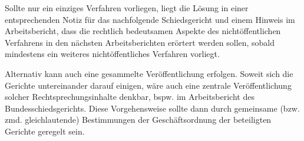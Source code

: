 Sollte nur ein einziges Verfahren vorliegen, liegt die Lösung in einer entsprechenden Notiz für das nachfolgende Schiedsgericht und einem Hinweis im Arbeitsbericht, dass die rechtlich bedeutsamen Aspekte des nichtöffentlichen Verfahrens in den nächsten Arbeitsberichten erörtert werden sollen, sobald mindestens ein weiteres nichtöffentliches Verfahren vorliegt.

Alternativ kann auch eine gesammelte Veröffentlichung erfolgen.
Soweit sich die Gerichte untereinander darauf einigen, wäre auch eine zentrale Veröffentlichung solcher Rechtsprechungsinhalte denkbar, bspw. im Arbeitsbericht des Bundesschiedsgerichts.
Diese Vorgehensweise sollte dann durch gemeinsame (bzw. zmd. gleichlautende) Bestimmungen der Geschäftsordnung der beteiligten Gerichte geregelt sein.

\chapterbib
